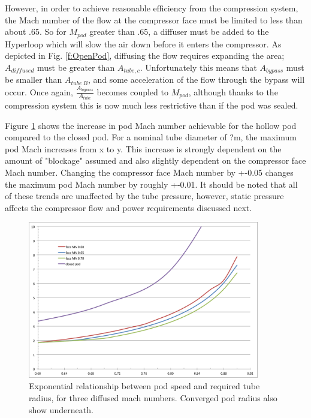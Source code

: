 \documentclass[heading.tex]{subfiles}
\begin{document}
However, in order to achieve reasonable efficiency from the compression system, the Mach number of the flow at the compressor face
must be limited to less than about .65. So for $M_{pod}$ greater than .65, a diffuser must be added to the Hyperloop 
which will slow the air down before it enters the compressor. As depicted in Fig. \ref{f:OpenPod}, diffusing the flow 
requires expanding the area; $A_{diffused}$ must be greater than $A_{tube,c}$. Unfortunately this means that
$A_{bypass}$ must be smaller than $A_{tube\ B}$, and some acceleration of the flow through the 
bypass will occur. Once again, $\frac{A_{bypass}}{A_{tube}}$ becomes coupled to $M_{pod}$, although thanks to the compression 
system this is now much less restrictive than if the pod was sealed. 

Figure \ref{f:machRAD} shows the increase in pod Mach number achievable for the hollow pod compared to the closed pod.
For a nominal tube diameter of ?m, the maximum pod Mach increases from x to y.
This increase is strongly dependent on the amount of "blockage" assumed and also slightly dependent on the compressor face Mach number.
Changing the compressor face Mach number by +-0.05 changes the maximum pod Mach number by roughly +-0.01.
It should be noted that all of these trends are unaffected by the tube pressure,
however, static pressure affects the compressor flow and power requirements discussed next.


\begin{figure}[H]
\centering
\includegraphics[width=0.9\textwidth]{images/mach_vs_rad4.png}
\caption[Tube and Pod Radius vs Mach]{Exponential relationship between pod speed and required tube radius, for three diffused mach numbers.
Converged pod radius also show underneath. }
\label{f:machRAD}
\end{figure}
\end{document}

